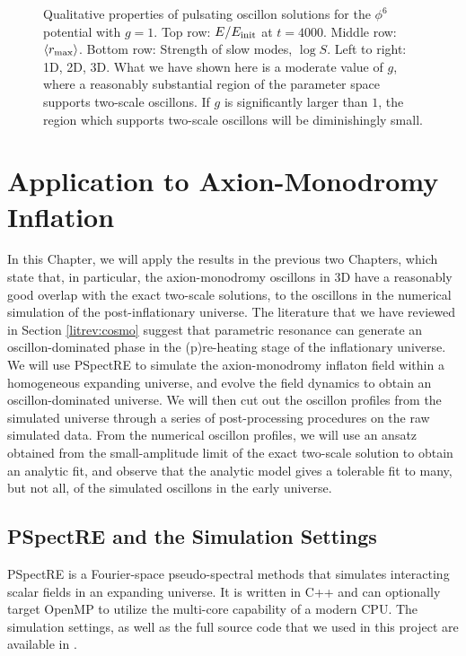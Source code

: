 \documentclass{report}
\begin{document}
\begin{figure}[p]
\begin{adjustwidth}{-1in}{-1in}
    \caption{Qualitative properties of pulsating oscillon solutions for the $\phi^6$ potential with $g=1$. Top row: $E/E_{\rm init}$ at $t=4000$.
      Middle row: $\langle r_{\rm max}\rangle$.
      Bottom row: Strength of slow modes, $\log{S}$.\quad
      Left to right: 1D, 2D, 3D. \qquad What we have shown here is a moderate value of $g$, where a reasonably substantial region of the parameter space supports two-scale oscillons. If $g$ is significantly larger than $1$, the region which supports two-scale oscillons will be diminishingly small.}\label{phi6}
  \end{adjustwidth}
\end{figure}

\chapter{Application to Axion-Monodromy Inflation}\label{appcosmo}

In this Chapter, we will apply the results in the previous two Chapters, which state that, in particular, the axion-monodromy oscillons in 3D have a reasonably good overlap with the exact two-scale solutions, to the oscillons in the numerical simulation of the post-inflationary universe. The literature that we have reviewed in Section \ref{litrev:cosmo} suggest that parametric resonance can generate an oscillon-dominated phase in the (p)re-heating stage of the inflationary universe. We will use PSpectRE \cite{Easther:2010qz} to simulate the axion-monodromy inflaton field within a homogeneous expanding universe, and evolve the field dynamics to obtain an oscillon-dominated universe. We will then cut out the oscillon profiles from the simulated universe through a series of post-processing procedures on the raw simulated data. From the numerical oscillon profiles, we will use an ansatz obtained from the small-amplitude limit of the exact two-scale solution to obtain an analytic fit, and observe that the analytic model gives a tolerable fit to many, but not all, of the simulated oscillons in the early universe.

\section{PSpectRE and the Simulation Settings}
PSpectRE \cite{Easther:2010qz} is a Fourier-space pseudo-spectral methods that simulates interacting scalar fields in an expanding universe. It is written in C++ and can optionally target OpenMP to utilize the multi-core capability of a modern CPU. The simulation settings, as well as the full source code that we used in this project are available in \cite{pspectregh}.
\end{document}

